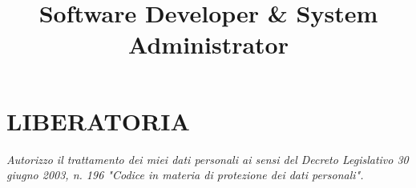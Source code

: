 \documentclass[9pt,a4paper,sans]{moderncv}
\title{Software Developer \& System Administrator}
\begin{document}
\makecvtitle













\section{LIBERATORIA}
\textit{Autorizzo il trattamento dei miei dati personali ai sensi del Decreto
Legislativo 30 giugno 2003, n. 196 "Codice in materia di protezione dei dati personali".}
\end{document}
